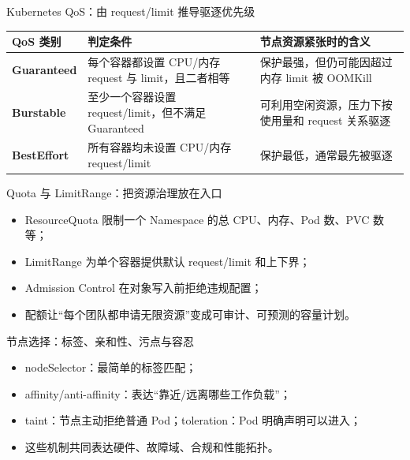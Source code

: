 \documentclass[UTF8,fontset=none,aspectratio=169,10pt]{beamer}
\begin{document}
\begin{frame}{Kubernetes QoS：由 request/limit 推导驱逐优先级}
\begin{tabularx}{\linewidth}{>{\bfseries}p{2.6cm}X X}
\toprule
QoS 类别 & 判定条件 & 节点资源紧张时的含义 \\
\midrule
Guaranteed & 每个容器都设置 CPU/内存 request 与 limit，且二者相等 & 保护最强，但仍可能因超过内存 limit 被 OOMKill \\
Burstable & 至少一个容器设置 request/limit，但不满足 Guaranteed & 可利用空闲资源，压力下按使用量和 request 关系驱逐 \\
BestEffort & 所有容器均未设置 CPU/内存 request/limit & 保护最低，通常最先被驱逐 \\
\bottomrule
\end{tabularx}
\vfill
{}
\end{frame}

\begin{frame}{Quota 与 LimitRange：把资源治理放在入口}
\begin{itemize}
  \item ResourceQuota 限制一个 Namespace 的总 CPU、内存、Pod 数、PVC 数等；
  \item LimitRange 为单个容器提供默认 request/limit 和上下界；
  \item Admission Control 在对象写入前拒绝违规配置；
  \item 配额让“每个团队都申请无限资源”变成可审计、可预测的容量计划。
\end{itemize}
\vfill
{}
\end{frame}

\begin{frame}{节点选择：标签、亲和性、污点与容忍}
\begin{itemize}
  \item nodeSelector：最简单的标签匹配；
  \item affinity/anti-affinity：表达“靠近/远离哪些工作负载”；
  \item taint：节点主动拒绝普通 Pod；toleration：Pod 明确声明可以进入；
  \item 这些机制共同表达硬件、故障域、合规和性能拓扑。
\end{itemize}
\vfill
{}
\end{frame}
\end{document}
